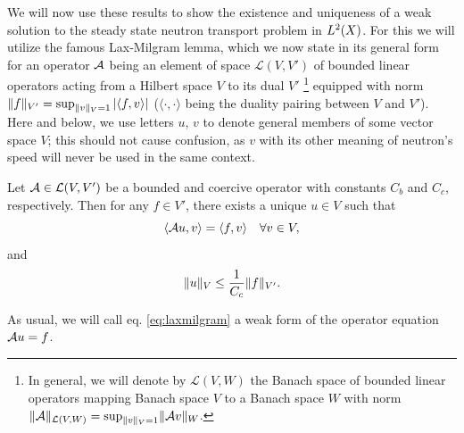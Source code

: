 {We will now use these results to show the existence and uniqueness of a weak solution to the steady state neutron
transport problem in $\Lp[2](X)$. For this we will utilize the famous Lax-Milgram lemma, which we now state in its
general form for an operator $\genop{A}$ being an element of space $\mathcal{L}(V,V')$ of bounded linear operators acting from 
a Hilbert space $V$ to its dual $V'$ \footnote{In general, we will denote by
$\mathcal{L}(V,W)$
 the Banach space of bounded linear operators mapping Banach space $V$ to a Banach space $W$ 
with norm $\norm[\mathcal{L}(V,W)]{\genop{A}} = \sup_{\norm[V]{v}=1} \norm[W]{\genop{A}v}$.} equipped with norm
$\norm[V']{f} = \sup_{\norm[V]{v} = 1} \abs{\langle f,v \rangle}$ ($\langle \cdot,\cdot\rangle$ being the duality 
pairing between $V$ and $V'$). Here and below, we use letters $u$, $v$ to denote general members of some vector space
$V$; this should not cause confusion, as $v$ with its other meaning of neutron's speed will never be used in the same
context.

\begin{lemma}\label{lem:lax-milgram}
	Let $\genop{A}\in\mathcal{L}(V,V')$ be a bounded and coercive operator with constants $C_b$ and $C_c$, respectively.
	Then for any $f\in V'$, there exists a unique $u\in V$ such that
	\begin{equation}\label{eq:laxmilgram}
		\langle \genop{A}u, v \rangle = \langle f, v \rangle  \quad \forall v\in V,
	\end{equation}
	and
	$$
		\norm[V]{u} \leq \frac{1}{C_c}\norm[V']{f}.
	$$
\end{lemma}
As usual, we will call eq. \eqref{eq:laxmilgram} a weak form of the operator equation $\genop{A}u = f$.

}
